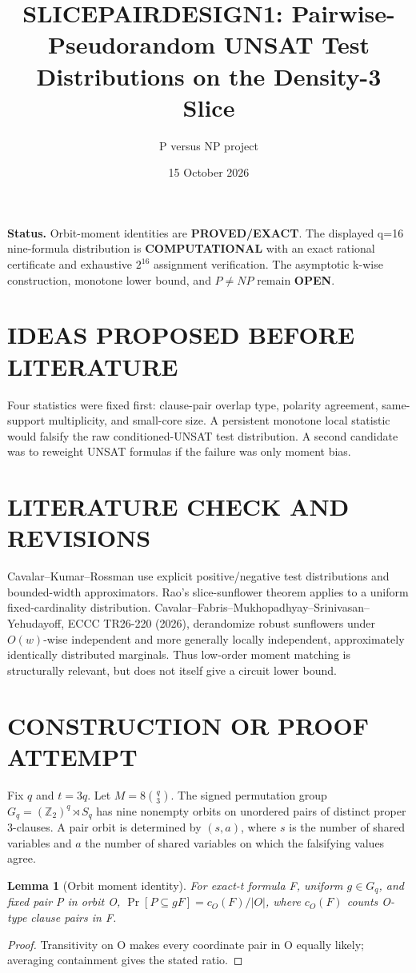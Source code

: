 \documentclass[11pt]{article}
\title{SLICEPAIRDESIGN1: Pairwise-Pseudorandom UNSAT Test Distributions on the Density-3 Slice}
\author{P versus NP project}
\date{15 October 2026}
\newtheorem{lemma}[theorem]{Lemma}
\begin{document}
\maketitle
\noindent\textbf{Status.} Orbit-moment identities are \textbf{PROVED/EXACT}. The displayed q=16 nine-formula distribution is \textbf{COMPUTATIONAL} with an exact rational certificate and exhaustive $2^{16}$ assignment verification. The asymptotic k-wise construction, monotone lower bound, and $P\ne NP$ remain \textbf{OPEN}.

\section{IDEAS PROPOSED BEFORE LITERATURE}
Four statistics were fixed first: clause-pair overlap type, polarity agreement, same-support multiplicity, and small-core size. A persistent monotone local statistic would falsify the raw conditioned-UNSAT test distribution. A second candidate was to reweight UNSAT formulas if the failure was only moment bias.

\section{LITERATURE CHECK AND REVISIONS}
Cavalar--Kumar--Rossman use explicit positive/negative test distributions and bounded-width approximators. Rao's slice-sunflower theorem applies to a uniform fixed-cardinality distribution. Cavalar--Fabris--Mukhopadhyay--Srinivasan--Yehudayoff, ECCC TR26-220 (2026), derandomize robust sunflowers under $O(w)$-wise independent and more generally locally independent, approximately identically distributed marginals. Thus low-order moment matching is structurally relevant, but does not itself give a circuit lower bound.

\section{CONSTRUCTION OR PROOF ATTEMPT}
Fix $q$ and $t=3q$. Let $M=8\binom q3$. The signed permutation group $G_q=(\mathbb Z_2)^q\rtimes S_q$ has nine nonempty orbits on unordered pairs of distinct proper 3-clauses. A pair orbit is determined by $(s,a)$, where $s$ is the number of shared variables and $a$ the number of shared variables on which the falsifying values agree.

\begin{lemma}[Orbit moment identity]
For exact-t formula F, uniform $g\in G_q$, and fixed pair P in orbit O, $\Pr[P\subseteq gF]=c_O(F)/|O|$, where $c_O(F)$ counts O-type clause pairs in F.
\end{lemma}
\begin{proof}Transitivity on O makes every coordinate pair in O equally likely; averaging containment gives the stated ratio.\end{proof}
\end{document}
